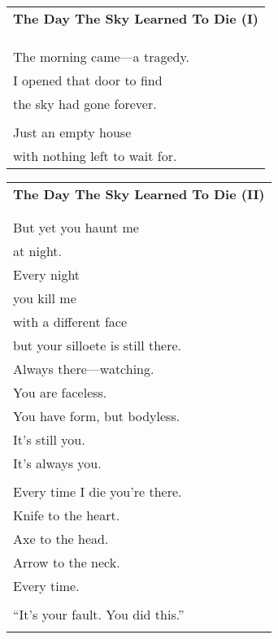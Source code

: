\documentclass{article}
\begin{document}
\newcommand{\h}{\hspace*{2ex}}
\newcommand{\HHHH}{\hspace*{32ex}}

\begin{center}
\begin{tabular}{l}
\multicolumn{1}{c}{\large\textbf{The Day The Sky Learned To Die (I)}} \\
\\\hline\\
%
%
%
%
%
\\
The morning came---a tragedy. \\
I opened that door to find \\
the sky had gone forever. \\
\\
Just an empty house \\
with nothing left to wait for. \\
\end{tabular}
\begin{tabular}{l}
\multicolumn{1}{c}{\large\textbf{The Day The Sky Learned To Die (II)}} \\
\\\hline\\
But yet you haunt me \\
at night. \\
Every night \\
you kill me \\
with a different face \\
but your silloete is still there. \\
Always there---watching. \\
You are faceless. \\
You have form, but bodyless. \\
It's still you. \\
It's always you. \\
\\
Every time I die you're there. \\
Knife to the heart. \\
Axe to the head. \\
Arrow to the neck. \\
Every time. \\
\\
``It's your fault.  You did this.'' \\
\\

\end{tabular}
\end{center}
\end{document}
